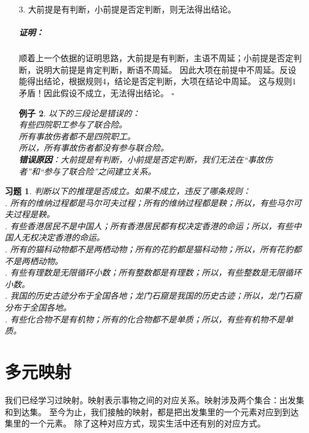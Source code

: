 \documentclass[12pt,UTF8]{ctexbook}
\newtheorem*{ex*}{例子}
\newtheorem{xt}{习题}[section]
\renewenvironment{proof}{\paragraph{\textbf{证明：}}}{\hfill$\square$}
\begin{document}
\begin{enumerate}
\begin{ex*}
        \indent 所以，所有绿色的东西都会腐烂。\\
        \textbf{错误原因}：小前提是有判断，所以结论应该是有判断。改为“有些绿色的东西会腐烂”则正确。
    \end{ex*}
    \item[3.] 大前提是有判断，小前提是否定判断，则无法得出结论。
    \begin{proof}
        顺着上一个依据的证明思路，大前提是有判断，主语不周延；小前提是否定判断，说明大前提是肯定判断，断语不周延。
        因此大项在前提中不周延。反设能得出结论，根据规则$4$，结论是否定判断，大项在结论中周延。
        这与规则$1$矛盾！因此假设不成立，无法得出结论。
    \end{proof}
    \begin{ex*}
        以下的三段论是错误的： \\
        \indent 有些四院职工参与了联合险。\\
        \indent 所有事故伤者都不是四院职工。\\
        \indent 所以，所有事故伤者都没有参与联合险。\\
        \textbf{错误原因}：大前提是有判断，小前提是否定判断，我们无法在“事故伤者”和“参与了联合险”之间建立关系。
    \end{ex*}
\end{enumerate}
\begin{xt}\label{xt:4-1-10}
    判断以下的推理是否成立。如果不成立，违反了哪条规则：\\
    . 所有的维纳过程都是马尔可夫过程；所有的维纳过程都是鞅；所以，有些马尔可夫过程是鞅。\\
    . 有些香港居民不是中国人；所有香港居民都有权决定香港的命运；所以，有些中国人无权决定香港的命运。\\
    . 所有的猫科动物都不是两栖动物；所有的花豹都是猫科动物；所以，所有花豹都不是两栖动物。\\
    . 有些有理数是无限循环小数；所有整数都是有理数；所以，有些整数是无限循环小数。\\
    . 我国的历史古迹分布于全国各地；龙门石窟是我国的历史古迹；所以，龙门石窟分布于全国各地。\\
    . 有些化合物不是有机物；所有的化合物都不是单质；所以，有些有机物不是单质。    
\end{xt}

\chapter{多元映射}
我们已经学习过映射。映射表示事物之间的对应关系。映射涉及两个集合：出发集和到达集。
至今为止，我们接触的映射，都是把出发集里的一个元素对应到到达集里的一个元素。
除了这种对应方式，现实生活中还有别的对应方式。
\end{document}
